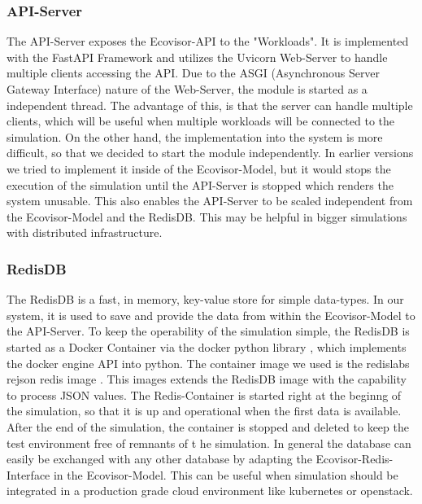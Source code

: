 \subsubsection{API-Server}
The API-Server exposes the Ecovisor-API to the "Workloads". It is implemented with the FastAPI Framework and utilizes the Uvicorn Web-Server \cite{uvicorn} to handle multiple clients accessing the API. Due to the ASGI (Asynchronous Server Gateway Interface) nature of the Web-Server, the module is started as a independent thread. The advantage of this, is that the server can handle multiple clients, which will be useful when multiple workloads will be connected to the simulation. On the other hand, the implementation into the system is more difficult, so that we decided to start the module independently. In earlier versions we tried to implement it inside of the Ecovisor-Model, but it would stops the execution of the simulation until the API-Server is stopped which renders the system unusable. This also enables the API-Server to be scaled independent from the Ecovisor-Model and the RedisDB. This may be helpful in bigger simulations with distributed infrastructure.

\subsubsection{RedisDB}
The RedisDB is a fast, in memory, key-value store for simple data-types. In our system, it is used to save and provide the data from within the Ecovisor-Model to the API-Server. To keep the operability of the simulation simple, the RedisDB is started as a Docker Container via the docker python library \cite{docker_python}, which implements the docker engine API into python. The container image we used is the redislabs rejson redis image \cite{RedisJSON}. This images extends the RedisDB image with the capability to process JSON values. The Redis-Container is started right at the beginng of the simulation, so that it is up and operational when the first data is available. After the end of the simulation, the container is stopped and deleted to keep the test environment free of remnants of t he simulation. 
In general the database can easily be exchanged with any other database by adapting the Ecovisor-Redis-Interface in the Ecovisor-Model. This can be useful when simulation should be integrated
in a production grade cloud environment like kubernetes or openstack.


